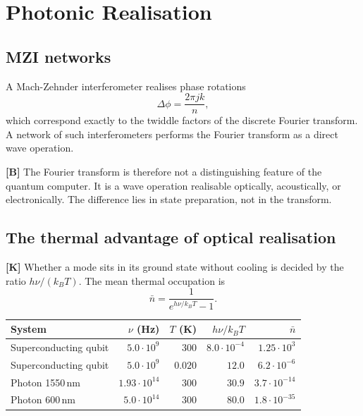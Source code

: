 \section{Photonic Realisation}
\label{sec:photonik}

\subsection{MZI networks}

A Mach-Zehnder interferometer realises phase rotations
\begin{equation}
  \Delta\phi = \frac{2\pi jk}{n},
\end{equation}
which correspond exactly to the twiddle factors of the discrete Fourier
transform. A network of such interferometers performs the Fourier transform as
a direct wave operation.

\textbf{[B]} The Fourier transform is therefore not a distinguishing feature of
the quantum computer. It is a wave operation realisable optically,
acoustically, or electronically. The difference lies in state preparation, not
in the transform.

\subsection{The thermal advantage of optical realisation}

\textbf{[K]} Whether a mode sits in its ground state without cooling is
decided by the ratio $h\nu/(k_B T)$. The mean thermal occupation is
\begin{equation}
  \bar n = \frac{1}{e^{h\nu/k_B T} - 1}.
\end{equation}

\begin{center}
\begin{tabular}{lrrrr}
\toprule
System & $\nu$ (Hz) & $T$ (K) & $h\nu/k_BT$ & $\bar n$ \\
\midrule
Superconducting qubit & $5.0\cdot10^{9}$ & $300$ & $8.0\cdot10^{-4}$
  & $1.25\cdot10^{3}$ \\
Superconducting qubit & $5.0\cdot10^{9}$ & $0.020$ & $12.0$
  & $6.2\cdot10^{-6}$ \\
Photon 1550\,nm & $1.93\cdot10^{14}$ & $300$ & $30.9$
  & $3.7\cdot10^{-14}$ \\
Photon 600\,nm & $5.0\cdot10^{14}$ & $300$ & $80.0$
  & $1.8\cdot10^{-35}$ \\
\bottomrule
\end{tabular}
\end{center}

